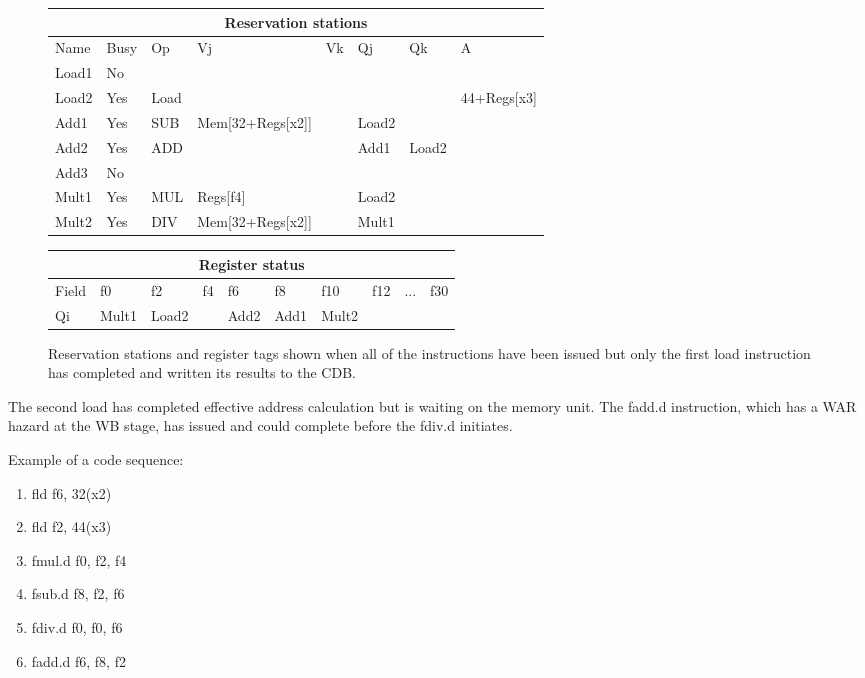 \begin{enumerate}
\begin{figure}[ht]
        \begin{tabular}{|l|l|l|l|l|l|l|l|}
            \hline
            \multicolumn{8}{|c|}{Reservation stations} \\
            \hline
            Name & Busy & Op & Vj & Vk & Qj & Qk & A \\
            \hline
            Load1 & No & & & & & & \\
            \hline
            Load2 & Yes & Load & & & & & 44+Regs[x3] \\
            \hline
            Add1 & Yes & SUB & Mem[32+Regs[x2]] & & Load2 & & \\
            \hline
            Add2 & Yes & ADD & & & Add1 & Load2 & \\
            \hline
            Add3 & No & & & & & & \\
            \hline
            Mult1 & Yes & MUL & Regs[f4] & & Load2 & & \\
            \hline
            Mult2 & Yes & DIV & Mem[32+Regs[x2]] & & Mult1 & & \\
            \hline
        \end{tabular}
        
        \vspace{0.5cm}
        
        \begin{tabular}{|l|l|l|l|l|l|l|l|l|l|}
            \hline
            \multicolumn{10}{|c|}{Register status} \\
            \hline
            Field & f0 & f2 & f4 & f6 & f8 & f10 & f12 & ... & f30 \\
            \hline
            Qi & Mult1 & Load2 & & Add2 & Add1 & Mult2 & & & \\
            \hline
        \end{tabular}
        \caption{Reservation stations and register tags shown when all of the instructions have been issued but only the first load instruction has completed and written its results to the CDB.}
    \end{figure}

    The second load has completed effective address calculation but is waiting on the memory unit. The fadd.d instruction, which has a WAR hazard at the WB stage, has issued and could complete before the fdiv.d initiates.
\end{enumerate}
    
    Example of a code sequence:
    \begin{enumerate}
        \item fld f6, 32(x2)
        \item fld f2, 44(x3)
        \item fmul.d f0, f2, f4
        \item fsub.d f8, f2, f6
        \item fdiv.d f0, f0, f6
        \item fadd.d f6, f8, f2
    \end{enumerate}
    
